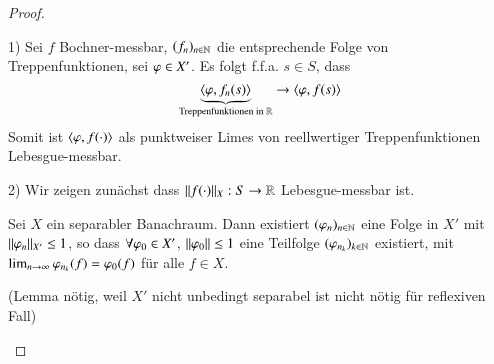\begin{proof}
    \begin{description}
        \item{1)}
        Sei $f$ Bochner-messbar, $(f_n)_{n\in\mathbb{N}}$ die entsprechende Folge von Treppenfunktionen, sei
        $\varphi \in X'$. Es folgt f.f.a. $s\in S$, dass
        \[
            \underbrace{\langle \varphi, f_n(s)\rangle}_{\text{Treppenfunktionen in $\mathbb{R}$}} \rightarrow \langle \varphi , f(s)\rangle
        \]
        Somit ist $\langle \varphi, f(\cdot)\rangle$ als punktweiser Limes von reellwertiger Treppenfunktionen 
        Lebesgue-messbar.
        \item{2)}
        Wir zeigen zunächst dass $\|f(\cdot)\|_X: S\rightarrow \mathbb{R}$ Lebesgue-messbar ist.

        \begin{lem}\label{27}
            Sei $X$ ein separabler Banachraum. Dann existiert $(\varphi_n)_{n\in \mathbb{N}}$ eine Folge in $X'$ mit
            $\|\varphi _n\|_{X'}\leq 1$, so dass $\forall \varphi_0\in X'$, $\|\varphi_0\|\leq 1$ eine Teilfolge
            $(\varphi_{n_k})_{k\in\mathbb{N}}$ existiert, mit $\lim_{n\rightarrow \infty}\varphi_{n_k}(f)=\varphi_0(f)$ für alle 
            $f\in X$.
        \end{lem}
        (Lemma nötig, weil $X'$ nicht unbedingt separabel ist nicht nötig für reflexiven Fall)


\end{description}
\end{proof}
